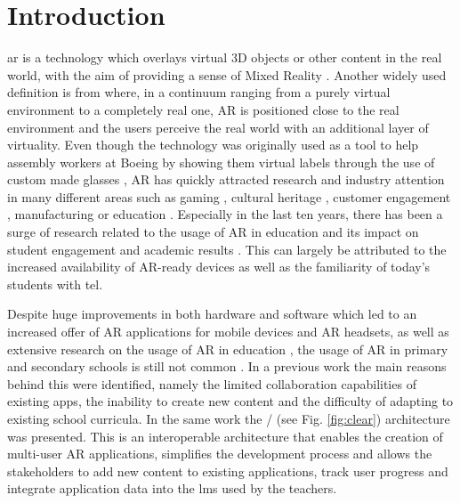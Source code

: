 \documentclass[pdflatex,sn-basic,iicol]{sn-jnl}%
\begin{document}



\maketitle

\section{Introduction}\label{sec:introduction}

\gls{ar} is a technology which overlays virtual 3D objects or other content in the real world, with the aim of providing a sense of Mixed Reality \citep{azuma1997survey}. Another widely used definition is from \cite{milgram1994taxonomy} where, in a continuum ranging from a purely virtual environment to a completely real one, AR is positioned close to the real environment and the users perceive the real world with an additional layer of virtuality. Even though the technology was originally used as a tool to help assembly workers at Boeing by showing them virtual labels through the use of custom made glasses \citep{caudell1992augmented}, AR has quickly attracted research and industry attention in many different areas such as gaming \citep{das2017augmented}, cultural heritage \citep{vlachos2022review}, customer engagement \citep{mclean2019shopping}, manufacturing \citep{ong2008augmented} or education \citep{garzon2019systematic}. Especially in the last ten years, there has been a surge of research related to the usage of AR in education and its impact on student engagement and academic results  \citep{bressler2013mixed, sirakaya2018effect, CHANG2022104641}. This can largely be attributed to the increased availability of AR-ready devices as well as the familiarity of today's students with \gls{tel}.

Despite huge improvements in both hardware and software which led to an increased offer of AR applications for mobile devices and AR headsets, as well as extensive research on the usage of AR in education \citep{7943075, akccayir2017advantages, chen2017new, ibanez2018augmented, pellas2019augmenting, 10.3897/jucs.76535}, the usage of AR in primary and secondary schools is still not common \citep{doi/10.2759/121671}. In a previous work \citep{Masneri2023} the main reasons behind this were identified, namely the limited collaboration capabilities of existing apps, the inability to create new content and the difficulty of adapting to existing school curricula. In the same work the \clear/ (see Fig. \ref{fig:clear}) architecture was presented. This is an interoperable architecture that enables the creation of multi-user AR applications, simplifies the development process and allows the stakeholders to add new content to existing applications, track user progress and integrate application data into the \gls{lms} used by the teachers.
\end{document}

